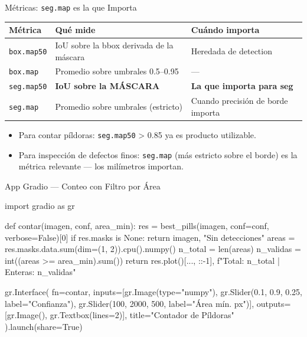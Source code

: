 \documentclass[aspectratio=169, 11pt]{beamer}
\begin{document}
\begin{frame}[shrink]{Métricas: \texttt{seg.map} es la que Importa}
  \vspace{8pt}
  {\footnotesize
  \begin{tabular}{@{}p{3.5cm} p{4.5cm} p{5.0cm}@{}}
    \toprule
    \rowcolor{arcaLightGray}
    \textbf{Métrica} & \textbf{Qué mide} & \textbf{Cuándo importa} \\
    \midrule
    \texttt{box.map50}   & IoU sobre la bbox derivada de la máscara & Heredada de detection \\
    \texttt{box.map}     & Promedio sobre umbrales 0.5--0.95 & --- \\
    \rowcolor{arcaGray}
    \texttt{seg.map50}   & \textbf{IoU sobre la MÁSCARA} & \textbf{La que importa para seg} \\
    \rowcolor{arcaGray}
    \texttt{seg.map}     & Promedio sobre umbrales (estricto) & Cuando precisión de borde importa \\
    \bottomrule
  \end{tabular}}
  \vspace{12pt}
  \begin{itemize}
    \item Para contar píldoras: \texttt{seg.map50} \textgreater{} 0.85 ya es producto utilizable.
    \item Para inspección de defectos finos: \texttt{seg.map} (más estricto sobre el borde) es la métrica relevante --- los milímetros importan.
  \end{itemize}
\end{frame}

\begin{frame}{App Gradio --- Conteo con Filtro por Área}
  \vspace{-4pt}
  \begin{pyblock}
import gradio as gr

def contar(imagen, conf, area_min):
    res = best_pills(imagen, conf=conf, verbose=False)[0]
    if res.masks is None:
        return imagen, "Sin detecciones"
    areas = res.masks.data.sum(dim=(1, 2)).cpu().numpy()
    n_total   = len(areas)
    n_validas = int((areas >= area_min).sum())
    return res.plot()[..., ::-1], f"Total: {n_total} | Enteras: {n_validas}"

gr.Interface(
    fn=contar,
    inputs=[gr.Image(type="numpy"),
            gr.Slider(0.1, 0.9, 0.25, label="Confianza"),
            gr.Slider(100, 2000, 500, label="Área mín. px")],
    outputs=[gr.Image(), gr.Textbox(lines=2)],
    title="Contador de Píldoras"
).launch(share=True)
  \end{pyblock}
\end{frame}
\end{document}
